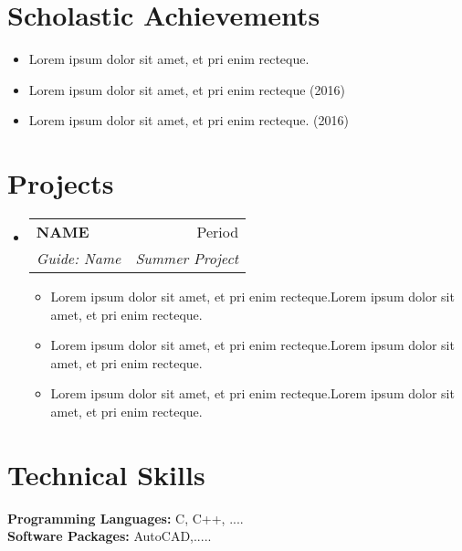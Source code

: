 \documentclass[a4paper,12pt]{article}
\makeatletter
\newlength{\mylen}
\newcommand{\resumeSubheading}[4]{
  \vspace{2pt}\item[\huge|]
    \begin{tabular*}{0.97\textwidth}{l@{\extracolsep{\fill}}r}
      \textbf{#1} & #2 \\
      \textit{\small #3} & \textit{\small #4} \\
    \end{tabular*}\vspace{-5pt}
}
\newcommand{\resumeSubHeadingListStart}{\begin{itemize}[leftmargin=*]}
\newcommand{\resumeSubHeadingListEnd}{\end{itemize}}
\makeatother
\begin{document}
\hfill \break
\hfill \break
\hfill \break
\hfill \break
\hfill \break
\hfill \break
\hfill \break
\hfill \break
\hfill \break
\hfill \break

\section{Scholastic Achievements}
\renewcommand\labelitemi{\raisebox{\mylen}{\tiny$\bullet$}}
  \begin{itemize}[nosep,wide]
  \itemsep0em
      \item Lorem ipsum dolor sit amet, et pri enim recteque. 
      \item Lorem ipsum dolor sit amet, et pri enim recteque \hfill (2016)
      \item Lorem ipsum dolor sit amet, et pri enim recteque. \hfill (2016)  
    \end{itemize}     


\vspace*{-10pt}
\section{Projects}

  \resumeSubHeadingListStart
    \resumeSubheading
      {NAME}{Period}
      {Guide: Name}{Summer Project}
      \begin{itemize}[nosep]
    \item Lorem ipsum dolor sit amet, et pri enim recteque.Lorem ipsum dolor sit amet, et pri enim recteque.
    \item Lorem ipsum dolor sit amet, et pri enim recteque.Lorem ipsum dolor sit amet, et pri enim recteque.
     \item Lorem ipsum dolor sit amet, et pri enim recteque.Lorem ipsum dolor sit amet, et pri enim recteque.

      \end{itemize}
      \resumeSubHeadingListEnd

\vspace*{-20pt}
\section{Technical Skills}
\hspace*{1em}\textbf{Programming Languages:} \hspace{1em}  C, C++, ....\\
\hspace*{1em}\textbf{Software Packages:}\hspace{4.7em} AutoCAD,.....
\end{document}
